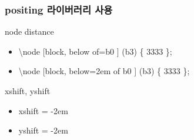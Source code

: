 \documentclass[ aspectratio=169,  10pt,blue,xcolor=pdftex,dvipsnames,table,handout,notes]{beamer}
\begin{document}
		\begin{frame}[t]
		\frametitle{positing 라이버러리 사용}

			\begin{block}{node distance}

			\begin{itemize}
			\item[] 	\textbackslash node [block, below of=b0 ] (b3) \{ 3333 \};
			\item[] 	\textbackslash node [block, below=2em of b0 ] (b3) \{ 3333 \};
			\end{itemize}

			\end{block}

			\begin{block}{xshift, yshift}

			\begin{itemize}
			\item[] 	xshift = -2em
			\item[] 	yshift = -2em
			\end{itemize}

			\end{block}

	
		\note[item]{ }

		\end{frame}



		\begin{frame}[plain]

			\centering
			\scalebox{4}{Placing Nodes}
	
		\note[item]{ }
		\end{frame}
\end{document}
